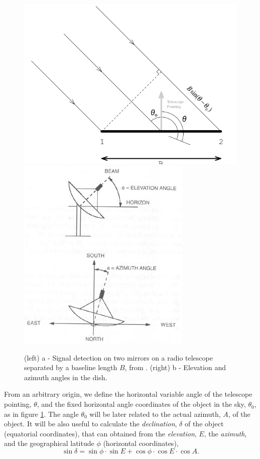 \begin{figure}[htb]
\begin{center}

 \includegraphics[scale=0.45]{figs/time.png}  \includegraphics[scale=0.81]{figs/ele.jpg}
\caption{(left)  a -  Signal detection on two mirrors on a radio telescope separated by a baseline length $B$, from \cite{sbu}. (right) b - Elevation and azimuth angles in the dish.}
\label{fig:t}
 
\end{center}
\end{figure}


From an arbitrary origin, we define the horizontal variable angle of the telescope pointing, $\theta$, and the fixed horizontal angle coordinates of the object in the sky, $\theta_0$, as in figure \ref{fig:t}. The angle $\theta_0$ will be later related to the actual azimuth, $A$, of the object. It will be also useful to calculate the {\it declination}, $\delta$ of the object (equatorial coordinates), that can obtained from the {\it elevation}, $E$, the {\it azimuth}, and the geographical latitude $\phi$ (horizontal coordinates)\cite{wiki},
\begin{equation}
\sin \delta = \sin \phi \cdot \sin E + \cos \phi \cdot \cos E \cdot \cos A.
\label{dec}
\end{equation}



